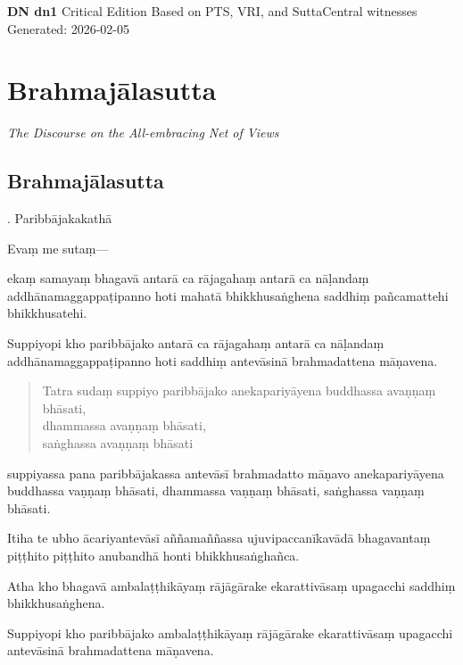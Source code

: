 \documentclass[11pt,twoside,openright]{book}
\begin{document}
\begin{titlepage}
\centering
\vspace*{2in}
{\Huge\bfseries DN dn1}
\vspace{0.5in}
{\Large Critical Edition}
\vfill
{\large Based on PTS, VRI, and SuttaCentral witnesses}
\vspace{0.25in}
{\small Generated: 2026-02-05}
\end{titlepage}

\chapter{Brahmajālasutta}
\begin{center}\textit{The Discourse on the All-embracing Net of Views}\end{center}

\section*{Brahmajālasutta}
. Paribbājakakathā
\pend

\pstart
Evaṃ me sutaṃ—
\pend

\pstart
ekaṃ samayaṃ bhagavā antarā ca rājagahaṃ antarā ca nāḷandaṃ addhānamaggappaṭipanno hoti mahatā bhikkhusaṅghena saddhiṃ pañcamattehi bhikkhusatehi.
\pend

\pstart
Suppiyopi kho paribbājako antarā ca rājagahaṃ antarā ca nāḷandaṃ addhānamaggappaṭipanno hoti saddhiṃ antevāsinā brahmadattena māṇavena.
\pend

\begin{verse}
Tatra sudaṃ suppiyo paribbājako anekapariyāyena buddhassa avaṇṇaṃ bhāsati,\\
\vin  dhammassa avaṇṇaṃ bhāsati,\\
\vin  saṅghassa avaṇṇaṃ bhāsati\\


\end{verse}
\pstart
suppiyassa pana paribbājakassa antevāsī brahmadatto māṇavo anekapariyāyena buddhassa vaṇṇaṃ bhāsati, dhammassa vaṇṇaṃ bhāsati, saṅghassa vaṇṇaṃ bhāsati.
\pend

\pstart
Itiha te ubho ācariyantevāsī aññamaññassa ujuvipaccanīkavādā bhagavantaṃ piṭṭhito piṭṭhito anubandhā honti bhikkhusaṅghañca.
\pend

\pstart
Atha kho bhagavā ambalaṭṭhikāyaṃ rājāgārake ekarattivāsaṃ upagacchi saddhiṃ bhikkhusaṅghena.
\pend

\pstart
Suppiyopi kho paribbājako ambalaṭṭhikāyaṃ rājāgārake ekarattivāsaṃ upagacchi antevāsinā brahmadattena māṇavena.
\pend
\end{document}
